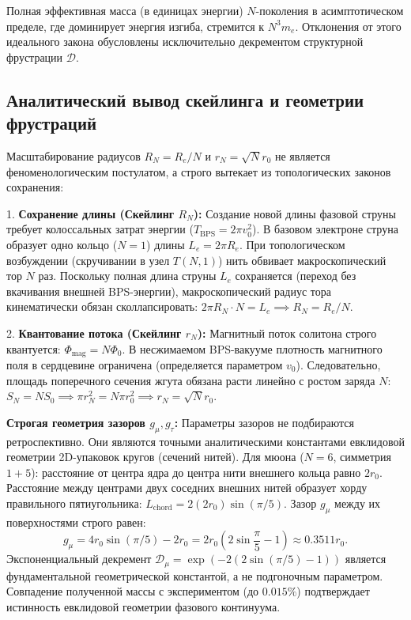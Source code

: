\documentclass[11pt,a4paper]{article}
\begin{document}
Полная эффективная масса (в единицах энергии) $N$-поколения в асимптотическом пределе, где доминирует энергия изгиба, стремится к $N^3 m_e$. Отклонения от этого идеального закона обусловлены исключительно декрементом структурной фрустрации $\mathcal{D}$.
	
\subsection{Аналитический вывод скейлинга и геометрии фрустраций}
Масштабирование радиусов $R_N = R_e/N$ и $r_N = \sqrt{N}r_0$ не является феноменологическим постулатом, а строго вытекает из топологических законов сохранения:

1. \textbf{Сохранение длины (Скейлинг $R_N$):} Создание новой длины фазовой струны требует колоссальных затрат энергии ($T_{\text{BPS}} = 2\pi v_0^2$). В базовом электроне струна образует одно кольцо ($N=1$) длины $L_e = 2\pi R_e$. При топологическом возбуждении (скручивании в узел $T(N,1)$) нить обвивает макроскопический тор $N$ раз. Поскольку полная длина струны $L_e$ сохраняется (переход без вкачивания внешней BPS-энергии), макроскопический радиус тора кинематически обязан сколлапсировать: $2\pi R_N \cdot N = L_e \implies R_N = R_e/N$.

2. \textbf{Квантование потока (Скейлинг $r_N$):} Магнитный поток солитона строго квантуется: $\Phi_{\text{mag}} = N \Phi_0$. В несжимаемом BPS-вакууме плотность магнитного поля в сердцевине ограничена (определяется параметром $v_0$). Следовательно, площадь поперечного сечения жгута обязана расти линейно с ростом заряда $N$: $S_N = N S_0 \implies \pi r_N^2 = N \pi r_0^2 \implies r_N = \sqrt{N} r_0$.

\textbf{Строгая геометрия зазоров $g_\mu, g_\tau$:}
Параметры зазоров не подбираются ретроспективно. Они являются точными аналитическими константами евклидовой геометрии 2D-упаковок кругов (сечений нитей).
Для мюона ($N=6$, симметрия $1+5$): расстояние от центра ядра до центра нити внешнего кольца равно $2r_0$. Расстояние между центрами двух соседних внешних нитей образует хорду правильного пятиугольника: $L_{\text{chord}} = 2 (2r_0) \sin(\pi/5)$. Зазор $g_\mu$ между их поверхностями строго равен:
\begin{equation}
g_\mu = 4r_0 \sin(\pi/5) - 2r_0 = 2r_0 \left( 2\sin\frac{\pi}{5} - 1 \right) \approx 0.3511 r_0.
\end{equation}
Экспоненциальный декремент $\mathcal{D}_\mu = \exp(-2(2\sin(\pi/5)-1))$ является фундаментальной геометрической константой, а не подгоночным параметром. Совпадение полученной массы с экспериментом (до $0.015\%$) подтверждает истинность евклидовой геометрии фазового континуума.
\end{document}
